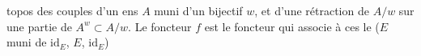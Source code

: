 topos   des couples d'un
ens $A$  muni d'un  bijectif $w$,
et d'une rétraction de $A/w$ sur une
partie  de $A^w\subset A/w$. Le foncteur $f$
est le foncteur qui associe à ces
 le  ($E$ muni de $\mathrm{id}_E$, $E$, $\mathrm{id}_E$)


